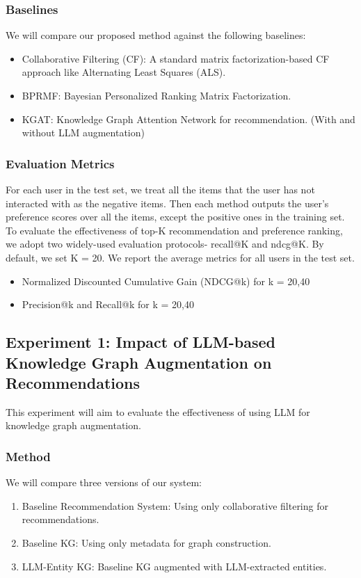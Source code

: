 \documentclass{article}
\begin{document}
\subsubsection{Baselines}
We will compare our proposed method against the following baselines:
\begin{itemize}
      \item Collaborative Filtering (CF): A standard matrix factorization-based
            CF approach like Alternating Least Squares (ALS).
      \item BPRMF: Bayesian Personalized Ranking Matrix Factorization.
      \item KGAT: Knowledge Graph Attention Network for recommendation. (With
            and
            without LLM augmentation)
\end{itemize}

\subsubsection{Evaluation Metrics}
For each user in the test set, we treat all the items that the user has not
interacted with as the negative items.
Then each method outputs the user's preference scores over all the items,
except the positive ones in the training set.
To evaluate the effectiveness of top-K recommendation and preference ranking,
we adopt two widely-used evaluation protocols- recall@K and ndcg@K. By default,
we set K = 20.
We report the average metrics for all users in the test set.
\begin{itemize}
      \item Normalized Discounted Cumulative Gain (NDCG@k) for k = 20,40
      \item Precision@k and Recall@k for k = 20,40
\end{itemize}

\subsection{Experiment 1: Impact of LLM-based Knowledge Graph Augmentation on
    Recommendations}

This experiment will aim to evaluate the effectiveness of using LLM for
knowledge graph augmentation.

\subsubsection{Method}
We will compare three versions of our system:
\begin{enumerate}
      \item Baseline Recommendation System: Using only collaborative filtering for recommendations.
      \item Baseline KG: Using only metadata for graph construction.
      \item LLM-Entity KG: Baseline KG augmented with LLM-extracted entities.
\end{enumerate}
\end{document}
